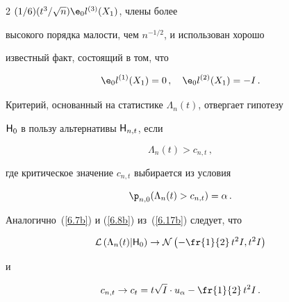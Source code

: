 \begin{multicols}{2}
$(1/6)(t^3/\sqrt{n}){\e}_0l^{(3)}(X_1)$, члены более


высокого порядка малости, чем $n^{-1/2}$, и использован хорошо


известный факт, состоящий в том, что


\begin{equation*}


{\e}_0l^{(1)}(X_1) = 0\,,\quad


{\e}_0l^{(2)}(X_1) = -I\,.




\end{equation*}


Критерий, основанный на статистике $\Lambda_n(t)$, отвергает гипотезу


${\sf H}_0$ в пользу альтернативы ${\sf H}_{n,t}$, если


\begin{equation*}


\Lambda_n(t) > c_{n,t}\,,




\end{equation*}


где критическое значение $c_{n,t}$ выбирается из условия


\begin{equation*}


{\p}_{n,0}(\Lambda_n(t) > c_{n,t}) = \alpha\,.




\end{equation*}


Аналогично~(\ref{6.7b}) и (\ref{6.8b}) из~(\ref{6.17b}) следует, что


\begin{equation}


{\cal L}\left (\Lambda_n(t)|{\sf H}_0\right ) \to {\cal N}


\left (-\fr{1}{2}\,t^2I,t^2I\right )


\label{6.21b}


\end{equation}


и


\begin{equation}


c_{n,t}\to c_t =


 t\sqrt{I}\cdot u_{\alpha}  -\fr{1}{2}\,t^2I\,.


\label{6.22b}


\end{equation}



\end{multicols}
